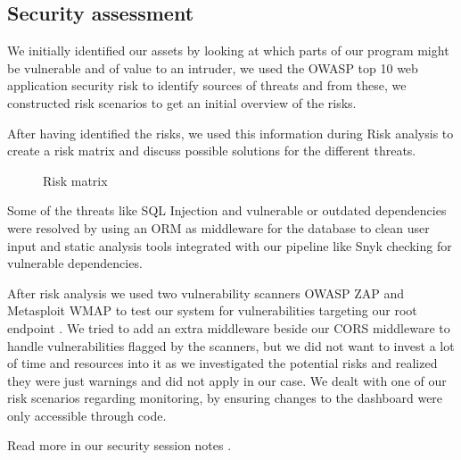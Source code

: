\subsection{Security assessment}
We initially identified our assets by looking at which parts of our program might be vulnerable and of value to an intruder, 
we used the OWASP top 10 web application security risk \cite{owasp-top-10} to identify sources of threats and from these, we constructed risk scenarios to get an initial overview of the risks.

After having identified the risks, we used this information during Risk analysis to create a risk matrix and discuss possible solutions for the different threats. 


\begin{wrapfigure}{R}{0.38\paperwidth}
    \hspace*{0.35in}
    \caption{Risk matrix}
    \label{fig:Risk-matrix}
\end{wrapfigure}

Some of the threats like SQL Injection and vulnerable or outdated dependencies were resolved by using an ORM \cite{gorm} as middleware for the database to clean user input and static analysis tools integrated with our pipeline like Snyk \cite{snyk} checking for vulnerable dependencies.

After risk analysis we used two vulnerability scanners OWASP ZAP \cite{tool:owasp-zap} and Metasploit \cite{metasploit} WMAP \cite{metasploit-wmap} to test our system for vulnerabilities targeting our root endpoint \cite{minitwit-root-endpoint}.
We tried to add an extra middleware beside our CORS middleware to handle vulnerabilities flagged by the scanners, but we did not want to invest a lot of time and resources into it as we investigated the potential risks and realized they were just warnings and did not apply in our case.
We dealt with one of our risk scenarios regarding monitoring, by ensuring changes to the dashboard were only accessible through code.

Read more in our security session notes \cite{repo:security-session-notes}.
